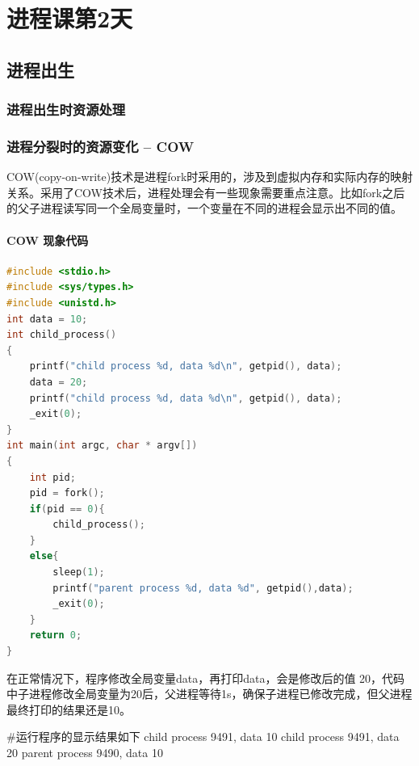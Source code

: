 


\part{进程课第2天}

\chapter{进程出生}
\section{进程出生时资源处理}



\section{进程分裂时的资源变化 -- COW}
COW(copy-on-write)技术是进程fork时采用的，涉及到虚拟内存和实际内存的映射关系。采用了COW技术后，进程处理会有一些现象需要重点注意。比如fork之后的父子进程读写同一个全局变量时，一个变量在不同的进程会显示出不同的值。
\subsection{COW 现象代码}
\begin{lstlisting}[language={C}]
#include <stdio.h>
#include <sys/types.h>
#include <unistd.h>
int data = 10;
int child_process()
{
    printf("child process %d, data %d\n", getpid(), data);
    data = 20;
    printf("child process %d, data %d\n", getpid(), data);
    _exit(0);
}
int main(int argc, char * argv[])
{
    int pid;
    pid = fork();
    if(pid == 0){
        child_process();
    }
    else{
        sleep(1);
        printf("parent process %d, data %d", getpid(),data);
        _exit(0);
    }
    return 0;
}
\end{lstlisting}
在正常情况下，程序修改全局变量data，再打印data，会是修改后的值 20，代码中子进程修改全局变量为20后，父进程等待1s，确保子进程已修改完成，但父进程最终打印的结果还是10。
\begin{latexcmd}[label= COW现象]
#运行程序的显示结果如下
child process 9491, data 10
child process 9491, data 20
parent process 9490, data 10
\end{latexcmd}

